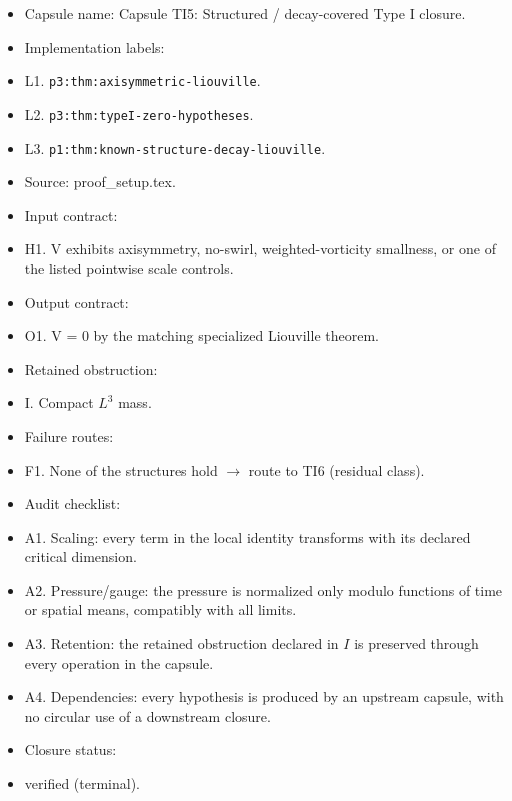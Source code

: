 \documentclass[11pt]{amsart}
\begin{document}
\begin{itemize}
  \item Capsule name: Capsule TI5: Structured / decay-covered Type I closure.
  \item Implementation labels:
  \item L1. \texttt{p3:thm:axisymmetric-liouville}.
  \item L2. \texttt{p3:thm:typeI-zero-hypotheses}.
  \item L3. \texttt{p1:thm:known-structure-decay-liouville}.
  \item Source: proof\_setup.tex.
  \item Input contract:
  \item H1. V exhibits axisymmetry, no-swirl, weighted-vorticity smallness, or one of the listed pointwise scale controls.
  \item Output contract:
  \item O1. V = 0 by the matching specialized Liouville theorem.
  \item Retained obstruction:
  \item I. Compact $L^3$ mass.
  \item Failure routes:
  \item F1. None of the structures hold $\to$ route to TI6 (residual class).
  \item Audit checklist:
  \item A1. Scaling: every term in the local identity transforms with its declared critical dimension.
  \item A2. Pressure/gauge: the pressure is normalized only modulo functions of time or spatial means, compatibly with all limits.
  \item A3. Retention: the retained obstruction declared in $I$ is preserved through every operation in the capsule.
  \item A4. Dependencies: every hypothesis is produced by an upstream capsule, with no circular use of a downstream closure.
  \item Closure status:
  \item verified (terminal).
\end{itemize}
\end{document}
